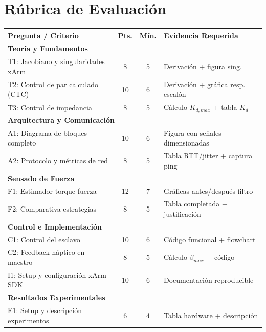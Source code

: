 \documentclass[journal,10pt,twoside]{IEEEtran}
\begin{document}
\appendix
\section{Rúbrica de Evaluación}
\label{app:rubrica}

\begin{center}
\small
\begin{tabular}{p{}ccp{}}
  \toprule
  \textbf{Pregunta / Criterio} & \textbf{Pts.} & \textbf{Mín.} & \textbf{Evidencia Requerida} \\
  \midrule
  \multicolumn{4}{l}{\textbf{Teoría y Fundamentos}} \\
  T1: Jacobiano y singularidades xArm & 8 & 5 & Derivación + figura sing. \\
  T2: Control de par calculado (CTC)  & 10 & 6 & Derivación + gráfica resp. escalón \\
  T3: Control de impedancia           & 8 & 5 & Cálculo $K_{d,max}$ + tabla $K_d$ \\
  \midrule
  \multicolumn{4}{l}{\textbf{Arquitectura y Comunicación}} \\
  A1: Diagrama de bloques completo    & 10 & 6 & Figura con señales dimensionadas \\
  A2: Protocolo y métricas de red     & 8 & 5 & Tabla RTT/jitter + captura ping \\
  \midrule
  \multicolumn{4}{l}{\textbf{Sensado de Fuerza}} \\
  F1: Estimador torque-fuerza         & 12 & 7 & Gráficas antes/después filtro \\
  F2: Comparativa estrategias         & 8 & 5 & Tabla completada + justificación \\
  \midrule
  \multicolumn{4}{l}{\textbf{Control e Implementación}} \\
  C1: Control del esclavo             & 10 & 6 & Código funcional + flowchart \\
  C2: Feedback háptico en maestro     & 8 & 5 & Cálculo $\beta_{max}$ + código \\
  I1: Setup y configuración xArm SDK  & 10 & 6 & Documentación reproducible \\
  \midrule
  \multicolumn{4}{l}{\textbf{Resultados Experimentales}} \\
  E1: Setup y descripción experimentos & 6 & 4 & Tabla hardware + descripción \\

\end{tabular}
\end{center}
\end{document}
